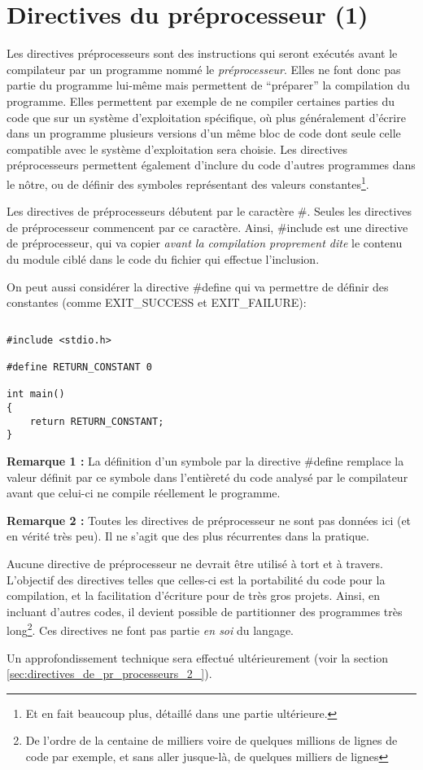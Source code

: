 \documentclass[../../../main.tex]{subfiles}
\begin{document}
\section{Directives du préprocesseur (1)}\label{sec:directives_pr_processeurs_1_}
Les directives préprocesseurs sont des instructions qui seront exécutés avant le compilateur par un programme nommé le \textit{préprocesseur}. Elles ne font donc pas partie du programme lui-même mais permettent de ``préparer'' la compilation du programme. Elles permettent par exemple de ne compiler certaines parties du code que sur un système d'exploitation spécifique, où plus généralement d'écrire dans un programme plusieurs versions d'un même bloc de code dont seule celle compatible avec le système d'exploitation sera choisie. Les directives préprocesseurs permettent également d'inclure du code d'autres programmes dans le nôtre, ou de définir des symboles représentant des valeurs constantes\footnote{Et en fait beaucoup plus, détaillé dans une partie ultérieure.}.
 
Les directives de préprocesseurs débutent par le caractère \#. Seules les directives de préprocesseur commencent par ce caractère. Ainsi, \textsf{\#include} est une directive de préprocesseur, qui va copier \textit{avant la compilation proprement dite} le contenu du module ciblé dans le code du fichier qui effectue l'inclusion.
 
On peut aussi considérer la directive \textsf{\#define} qui va permettre de définir des constantes (comme \textsf{EXIT\_SUCCESS} et \textsf{EXIT\_FAILURE}):
\begin{lstlisting}[title=Exemple]
\end{lstlisting}
\begin{verbatim}
#include <stdio.h>

#define RETURN_CONSTANT 0

int main()
{
	return RETURN_CONSTANT;
}
\end{verbatim}
\textbf{Remarque 1 :} La définition d'un symbole par la directive \textsf{\#define} remplace la valeur définit par ce symbole dans l'entièreté du code analysé par le compilateur avant que celui-ci ne compile réellement le programme.
 
\textbf{Remarque 2 :} Toutes les directives de préprocesseur ne sont pas données ici (et en vérité très peu). Il ne s'agit que des plus récurrentes dans la pratique.
 
Aucune directive de préprocesseur ne devrait être utilisé à tort et à travers. L'objectif des directives telles que celles-ci est la portabilité du code pour la compilation, et la facilitation d'écriture pour de très gros projets. Ainsi, en incluant d'autres codes, il devient possible de partitionner des programmes très long\footnote{De l'ordre de la centaine de milliers voire de	quelques millions de lignes de code par exemple, et sans aller jusque-là, de quelques milliers de lignes}. Ces directives ne font pas partie \textit{en soi} du langage.
 
Un approfondissement technique sera effectué ultérieurement (voir la section \ref{sec:directives_de_pr_processeurs_2_}).
\end{document}
